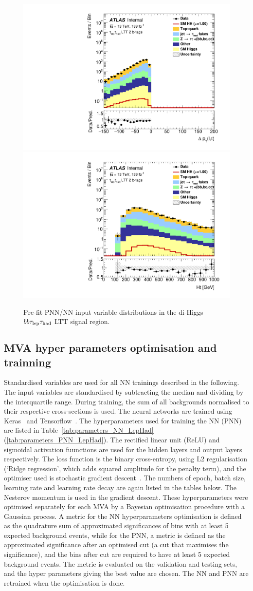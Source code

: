 \begin{figure}
\includegraphics[width=.32\textwidth]{DiHiggs/plots/MVA/LTT/Region_BMin0_incJet1_distdPtLepTau_J2_D_T2_SpcTauLH_Y2015_LTT1_L1_Prefitlog.pdf}
\includegraphics[width=.32\textwidth]{DiHiggs/plots/MVA/LTT/Region_BMin0_incJet1_distHt_J2_D_T2_SpcTauLH_Y2015_LTT1_L1_Prefitlog.pdf}
\caption{Pre-fit PNN/NN input variable distributions in the di-Higgs $bb\tau_{\mathrm{lep}}\tau_{\mathrm{had}}$ LTT signal region.}
\label{fig:lephadmvainputsltt}
\end{figure}


\subsection{MVA hyper parameters optimisation and trainning}
Standardised variables are used for all NN trainings described in the following.
The input variables are standardised by subtracting the median and dividing by the
interquartile range.
During training, the sum of all backgrounds normalised to
their respective cross-sections is used. 
The neural networks are trained using
Keras~\cite{keras} and Tensorflow~\cite{tensorflow}.
The hyperparameters used for training the NN (PNN) are 
listed in Table~\ref{tab:parameters_NN_LepHad} (\ref{tab:parameters_PNN_LepHad}).
The rectified linear unit (ReLU) and sigmoidal activation fuunctions 
are used for the hidden layers and output layers respectively.
The loss function is the binary cross-entropy, 
using L2 regularisation (`Ridge regression', which adds squared amplitude 
for the penalty term), and the optimiser used 
is stochastic gradient descent~\cite{Goodfellow-et-al-2016}.
The numbers of epoch, batch size, learning rate and 
learning rate decay are again listed in the tables below. 
The Nesterov momentum is used in the gradient descent. 
These hyperparameters were optimised 
separately for each MVA by a Bayesian optimisation procedure with 
a Gaussian process. 
A metric for the NN hyperparameters optimisation is defined 
as the quadrature sum of approximated significances
of bins with at least 5 expected background events,
while for the PNN, a metric is defined as the approximated
significance after an optimised cut (a cut that maximises the 
significance), and the bins after cut are required to have 
at least 5 expected background events. 
The metric is evaluated on the validation and testing sets,
and the hyper parameters giving the best value are chosen. 
The NN and PNN are retrained when the optimisation is done. 

